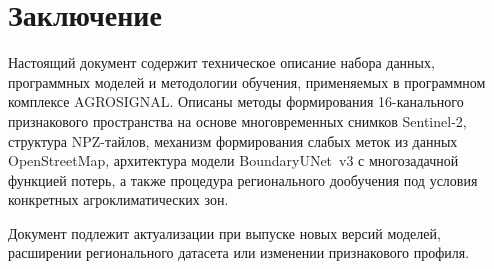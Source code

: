 \documentclass[14pt,a4paper]{extarticle}
\begin{document}
\section*{Заключение}

Настоящий документ содержит техническое описание набора данных, программных
моделей и методологии обучения, применяемых в программном комплексе AGROSIGNAL.
Описаны методы формирования 16-канального признакового пространства на основе
многовременных снимков Sentinel-2, структура NPZ-тайлов, механизм формирования
слабых меток из данных OpenStreetMap, архитектура модели BoundaryUNet~v3
с многозадачной функцией потерь, а также процедура регионального дообучения
под условия конкретных агроклиматических зон.

Документ подлежит актуализации при выпуске новых версий моделей,
расширении регионального датасета или изменении признакового профиля.
\end{document}
